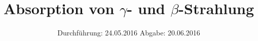 

\subject{V704 Korrektur}
\title{Absorption von $γ$- und $β$-Strahlung}
\date{
  Durchführung: 24.05.2016
  \hspace{3em}
  Abgabe: 20.06.2016
}



\maketitle
\thispagestyle{empty}
\tableofcontents
\newpage







\printbibliography


